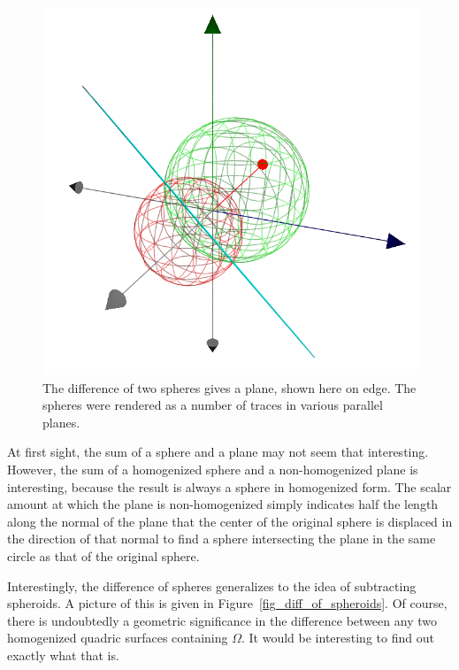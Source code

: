 \documentclass[12pt]{article}
\numberwithin{equation}{section}
\begin{document}
\begin{figure}
\includegraphics[scale=0.7]{DiffOfSpheres}
\caption{The difference of two spheres gives a plane, shown here on edge.  The spheres were rendered as a number of traces in various parallel planes.}
\label{fig_diff_of_spheres}
\end{figure}

At first sight, the sum of a sphere and a plane may not seem that interesting.
However, the sum of a homogenized sphere and a non-homogenized plane is
interesting, because the result is always a sphere in homogenized form.  The
scalar amount at which the plane is non-homogenized simply indicates half
the length along the normal of the plane that the center of the original sphere
is displaced in the direction of that normal to find a sphere intersecting the
plane in the same circle as that of the original sphere.

Interestingly, the difference of spheres generalizes to the idea of subtracting
spheroids.  A picture of this is given in Figure~\ref{fig_diff_of_spheroids}.
Of course, there is undoubtedly a geometric significance in the difference
between any two homogenized quadric surfaces containing $\Omega$.  It
would be interesting to find out exactly what that is.
\end{document}

